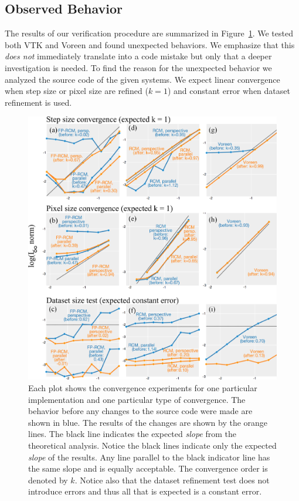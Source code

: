 \subsection{Observed Behavior}

The results of our verification procedure are summarized in
Figure~\ref{fig:convergence}.  We tested both VTK and Voreen and found
unexpected behaviors.  We emphasize that this \emph{does not}
immediately translate into a code mistake but only that a deeper
investigation is needed. To find the reason for the unexpected behavior we
analyzed the source code of the given systems.  We expect linear
convergence when step size or pixel size are refined ($k = 1$) and
constant error when dataset refinement is used.

\begin{figure}
\centering
\includegraphics[width=.9\linewidth]{chapter5/figures/convergence_table.png}
\caption{\label{fig:convergence} Each plot shows the convergence
  experiments for one particular implementation and one particular
  type of convergence. The behavior before any changes to the source
  code were made are shown in blue. The results of the changes are shown by the
  orange lines. The black line indicates the expected \emph{slope} from the
  theoretical analysis. Notice the black lines indicate only the
  expected \emph{slope} of the results. Any line parallel to the black
  indicator line has the same slope and is equally acceptable.  The
  convergence order is denoted by $k$. Notice also that the dataset refinement test does not introduce errors and thus all that is expected is a constant error.
}
\end{figure}

